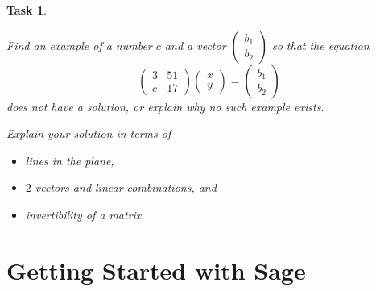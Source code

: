 \documentclass[10pt,]{book}
\theoremstyle{plain}
\numberwithin{equation}{section}
\newtheorem{task}{Task}[chapter]
\begin{document}
\begin{task}
\label{task-30}

          Find an example of a number \(c\) and a vector \(\left(
          \begin{smallmatrix} b_1 \\ b_2 \end{smallmatrix}\right)\)
          so that the equation\[
            \begin{pmatrix} 3 & 51 \\ c & 17 \end{pmatrix}
            \begin{pmatrix} x \\ y \end{pmatrix} =
            \begin{pmatrix} b_1 \\ b_2 \end{pmatrix}
          \]
          does not have a solution, or explain why no such example exists.
\par

          Explain your solution in terms of
          \begin{itemize}
\item{}lines in the plane,\item{}\(2\)-vectors and linear combinations, and\item{}invertibility of a matrix.\end{itemize}

\end{task}
\clearpage
\typeout{************************************************}
\typeout{************************************************}
\section[Getting Started with Sage]{Getting Started with Sage}\label{start-sage}
\typeout{************************************************}
\typeout{************************************************}
\end{document}
